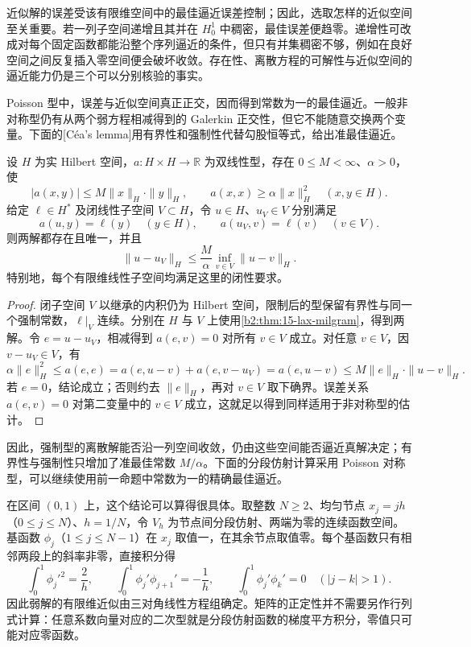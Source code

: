 近似解的误差受该有限维空间中的最佳逼近误差控制；因此，选取怎样的近似空间至关重要。若一列子空间递增且其并在 \(H_0^1\) 中稠密，最佳误差便趋零。递增性可改成对每个固定函数都能沿整个序列逼近的条件，但只有并集稠密不够，例如在良好空间之间反复插入零空间便会破坏收敛。存在性、离散方程的可解性与近似空间的逼近能力仍是三个可以分别核验的事实。

\ProseParagraphBreak

Poisson 型中，误差与近似空间真正正交，因而得到常数为一的最佳逼近。一般非对称型仍有从两个弱方程相减得到的 Galerkin 正交性，但它不能随意交换两个变量。下面的[Céa's lemma]用有界性和强制性代替勾股恒等式，给出准最佳逼近。

\begin{proposition}[Céa 引理]\label{b2:prop:15-cea}
设 \(H\) 为实 Hilbert 空间，\(a:H\times H\to\mathbb R\) 为双线性型，存在 \(0\leq M<\infty\)、\(\alpha>0\)，使
\[
 |a(x,y)|\leq M\|x\|_H\cdot\|y\|_H,\qquad
 a(x,x)\geq\alpha\|x\|_H^2\quad(x,y\in H).
\]
给定 \(\ell\in H^*\) 及闭线性子空间 \(V\subset H\)，令 \(u\in H\)、\(u_V\in V\) 分别满足
\[
 a(u,y)=\ell(y)\quad(y\in H),\qquad
 a(u_V,v)=\ell(v)\quad(v\in V).
\]
则两解都存在且唯一，并且
\[
 \|u-u_V\|_H\leq\frac M\alpha\inf_{v\in V}\|u-v\|_H.
\]
特别地，每个有限维线性子空间均满足这里的闭性要求。
\end{proposition}
\begin{proof}
闭子空间 \(V\) 以继承的内积仍为 Hilbert 空间，限制后的型保留有界性与同一个强制常数，\(\ell|_V\) 连续。分别在 \(H\) 与 \(V\) 上使用\cref{b2:thm:15-lax-milgram}，得到两解。令 \(e=u-u_V\)，相减得到 \(a(e,v)=0\) 对所有 \(v\in V\) 成立。对任意 \(v\in V\)，因 \(v-u_V\in V\)，有
\[
 \alpha\|e\|_H^2\leq a(e,e)
 =a(e,u-v)+a(e,v-u_V)=a(e,u-v)
 \leq M\|e\|_H\cdot\|u-v\|_H.
\]
若 \(e=0\)，结论成立；否则约去 \(\|e\|_H\)，再对 \(v\in V\) 取下确界。误差关系 \(a(e,v)=0\) 对第二变量中的 \(v\in V\) 成立，这就足以得到同样适用于非对称型的估计。
\end{proof}

因此，强制型的离散解能否沿一列空间收敛，仍由这些空间能否逼近真解决定；有界性与强制性只增加了准最佳常数 \(M/\alpha\)。下面的分段仿射计算采用 Poisson 对称型，可以继续使用前一命题中常数为一的精确最佳逼近。

\ProseParagraphBreak

在区间 \((0,1)\) 上，这个结论可以算得很具体。取整数 \(N\geq2\)、均匀节点 \(x_j=jh\)（\(0\leq j\leq N\)）、\(h=1/N\)，令 \(V_h\) 为节点间分段仿射、两端为零的连续函数空间。基函数 \(\phi_j\)（\(1\leq j\leq N-1\)）在 \(x_j\) 取值一，在其余节点取值零。每个基函数只有相邻两段上的斜率非零，直接积分得
\[\int_0^1\phi_j'^2=\frac2h,\qquad
 \int_0^1\phi_j'\phi_{j+1}'=-\frac1h,\qquad
 \int_0^1\phi_j'\phi_k'=0\quad(|j-k|>1).\]
因此弱解的有限维近似由三对角线性方程组确定。矩阵的正定性并不需要另作行列式计算：任意系数向量对应的二次型就是分段仿射函数的梯度平方积分，零值只可能对应零函数。

